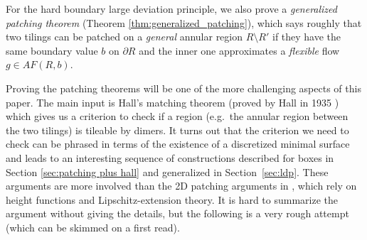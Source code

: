 \documentclass[11pt]{article}
\theoremstyle{remark}
\theoremstyle{definition}
\begin{document}
For the hard boundary large deviation principle, we also prove a \textit{generalized patching theorem} (Theorem \ref{thm:generalized_patching}), which says roughly that two tilings can be patched on a \textit{general} annular region $R\setminus R'$ if they have the same boundary value $b$ on $\partial R$ and the inner one approximates a \textit{flexible} flow $g\in AF(R,b)$. 

Proving the patching theorems will be one of the more challenging aspects of this paper. The main input is Hall's matching theorem (proved by Hall in 1935 \cite{hallmarriage}) which gives us a criterion to check if a region (e.g.\ the annular region between the two tilings) is tileable by dimers. It turns out that the criterion we need to check can be phrased in terms of the existence of a discretized minimal surface and leads to an interesting sequence of constructions described for boxes in Section \ref{sec:patching plus hall} and generalized in Section~\ref{sec:ldp}. These arguments are more involved than the 2D patching arguments in \cite{cohn2001variational}, which rely on height functions and Lipschitz-extension theory. It is hard to summarize the argument without giving the details, but the following is a very rough attempt (which can be skimmed on a first read).
\end{document}
